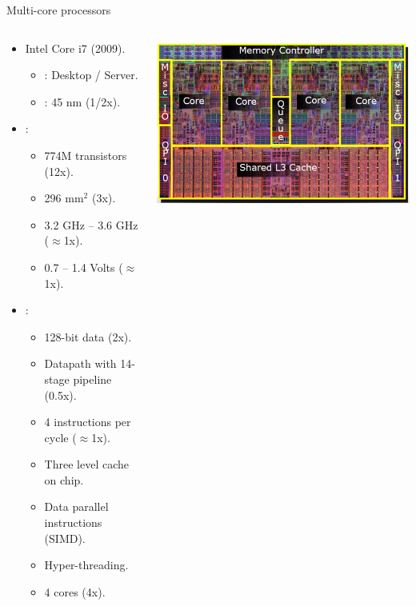 \begin{frame}[t,shrink=20]{Multi-core processors}
\begin{columns}[T]
  \begin{column}{.65\textwidth}
    \begin{itemize}
      \item Intel Core i7 (2009).
        \begin{itemize}
          \item {}: Desktop / Server.
          \item {}: 45 nm (1/2x).
        \end{itemize}
      \item {}:
        \begin{itemize}
          \item 774M transistors (12x).
          \item 296 mm$^2$ (3x).
          \item 3.2 GHz -- 3.6 GHz ($\approx$1x).
          \item 0.7 -- 1.4 Volts ($\approx$1x).
        \end{itemize}
      \item {}:
        \begin{itemize}
          \item 128-bit data (2x).
          \item Datapath with 14-stage pipeline (0.5x).
          \item 4 instructions per cycle ($\approx$1x).
          \item Three level cache on chip.
          \item Data parallel instructions (SIMD).
          \item Hyper-threading.
          \item 4 cores (4x).
        \end{itemize} 
    \end{itemize}
  \end{column}
  \begin{column}{.35\textwidth}
    \includegraphics[width=.9\textwidth]{images/intel-core-i7-die.jpg}\\

\end{column}
\end{columns}
\end{frame}
